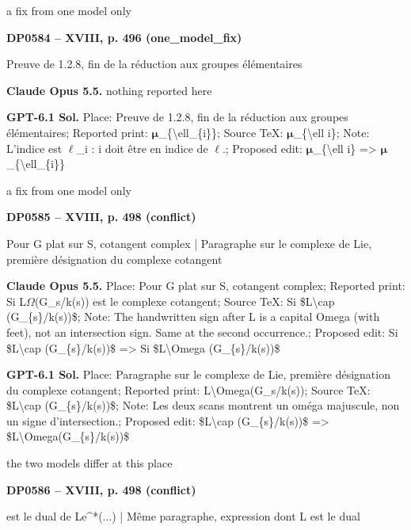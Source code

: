 a fix from one model only\par
\par\noindent\hypertarget{DP0584}{}\textbf{DP0584 -- XVIII, p. 496 (one\_model\_fix)}\par
Preuve de 1.2.8, fin de la réduction aux groupes élémentaires\par
\textbf{Claude Opus 5.5.} nothing reported here\par
\textbf{GPT-6.1 Sol.} Place: Preuve de 1.2.8, fin de la réduction aux groupes élémentaires; Reported print: \ensuremath{𝛍}\_\{\textbackslash{}ell\_\{i\}\}; Source TeX: \ensuremath{𝛍}\_\{\textbackslash{}ell i\}; Note: L'indice est \ensuremath{\ell}\_i : i doit être en indice de \ensuremath{\ell}.; Proposed edit: \ensuremath{𝛍}\_\{\textbackslash{}ell i\} =\allowbreak > \ensuremath{𝛍}\_\{\textbackslash{}ell\_\{i\}\}\par
a fix from one model only\par
\par\noindent\hypertarget{DP0585}{}\textbf{DP0585 -- XVIII, p. 498 (conflict)}\par
Pour G plat sur S, cotangent complex | Paragraphe sur le complexe de Lie, première désignation du complexe cotangent\par
\textbf{Claude Opus 5.5.} Place: Pour G plat sur S, cotangent complex; Reported print: Si L\ensuremath{\Omega}(G\_s/k(s)) est le complexe cotangent; Source TeX: Si \$L\textbackslash{}cap (G\_\{s\}/k(s))\$; Note: The handwritten sign after L is a capital Omega (with feet), not an intersection sign. Same at the second occurrence.; Proposed edit: Si \$L\textbackslash{}cap (G\_\{s\}/k(s))\$ =\allowbreak > Si \$L\textbackslash{}Omega (G\_\{s\}/k(s))\$\par
\textbf{GPT-6.1 Sol.} Place: Paragraphe sur le complexe de Lie, première désignation du complexe cotangent; Reported print: L\textbackslash{}Omega(G\_s/k(s)); Source TeX: \$L\textbackslash{}cap (G\_\{s\}/k(s))\$; Note: Les deux scans montrent un oméga majuscule, non un signe d'intersection.; Proposed edit: \$L\textbackslash{}cap (G\_\{s\}/k(s))\$ =\allowbreak > \$L\textbackslash{}Omega(G\_\{s\}/k(s))\$\par
the two models differ at this place\par
\par\noindent\hypertarget{DP0586}{}\textbf{DP0586 -- XVIII, p. 498 (conflict)}\par
est le dual de Le\textasciicircum{}*(...) | Même paragraphe, expression dont L est le dual\par
